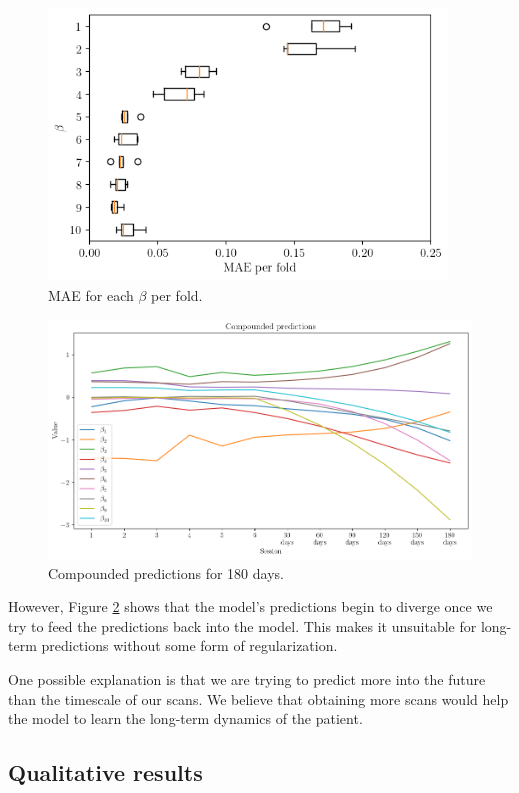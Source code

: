 \begin{figure}[H]
	\centering
	\includegraphics[width=300pt]{files/mae_folds.png}
	\caption{MAE for each $\beta$ per fold.}
	\label{fig:fold-mae}
\end{figure}

\begin{figure}[H]
	\centering
	\includegraphics[width=\textwidth]{files/compounded.png}
	\caption{Compounded predictions for 180 days.}
	\label{fig:compounded}
\end{figure}

However, Figure \ref{fig:compounded} shows that the model's predictions begin
to diverge once we try to feed the predictions back into the model. This makes
it unsuitable for long-term predictions without some form of regularization.

One possible explanation is that we are trying to predict more into the future
than the timescale of our scans. We believe that obtaining more scans would
help the model to learn the long-term dynamics of the patient.

\subsection{Qualitative results}

